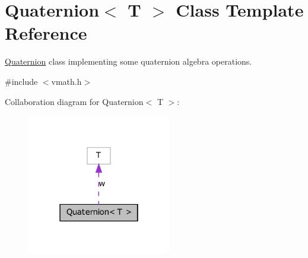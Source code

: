 \hypertarget{class_quaternion}{
\section{Quaternion$<$ T $>$ Class Template Reference}
\label{class_quaternion}
}


\hyperlink{class_quaternion}{Quaternion} class implementing some quaternion algebra operations.  




{\ttfamily \#include $<$vmath.h$>$}



Collaboration diagram for Quaternion$<$ T $>$:
\nopagebreak
\begin{figure}[H]
\begin{center}
\leavevmode
\includegraphics[width=178pt]{class_quaternion__coll__graph}
\end{center}
\end{figure}
